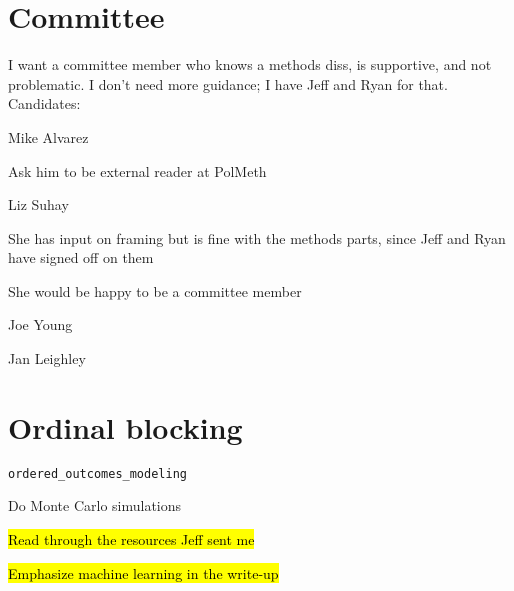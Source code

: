 \section*{Committee}
	\begin{coi}
		\item I want a committee member who knows a methods diss, is supportive, and not problematic. I don't need more guidance; I have Jeff and Ryan for that. Candidates:
			\begin{coi}
				\item Mike Alvarez
					\begin{coi}
						\item Ask him to be external reader at PolMeth
					\end{coi}
				\item Liz Suhay
					\begin{coi}
						\item She has input on framing but is fine with the methods parts, since Jeff and Ryan have signed off on them
						\item She would be happy to be a committee member
					\end{coi}
				\item Joe Young
				\item Jan Leighley
			\end{coi}
	\end{coi}



\section*{Ordinal blocking}
	\begin{coi}
		\item \texttt{ordered\_outcomes\_modeling}
			\begin{coi}
				\item Do Monte Carlo simulations
					\begin{coi}
						\item \hl{Read through the resources Jeff sent me}
					\end{coi}
				\item \hl{Emphasize machine learning in the write-up}
			\end{coi}
	\end{coi}
	
